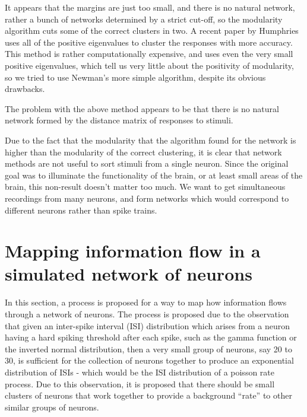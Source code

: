It appears that the margins are just too small, and there is no natural 
network, rather a bunch of networks determined by a strict cut-off, so the 
modularity algorithm cuts some of the correct clusters in two.  A recent paper 
by Humphries \cite{Humphries2011a} uses all of the positive eigenvalues to 
cluster the responses with more accuracy. This method is 
rather computationally expensive, and uses even the very small positive 
eigenvalues, which tell us very little about the positivity of modularity, so 
we tried to use Newman's more simple algorithm, despite its obvious drawbacks.

The problem with the above method appears to be that there is no natural network formed by the distance matrix of responses to stimuli.

Due to the fact that the modularity that the algorithm found for the network is 
higher than the modularity of the correct clustering, it is clear that network 
methods are not useful to sort stimuli from a single neuron.  Since the 
original goal was to illuminate the functionality of the brain, or at least 
small areas of the brain, this non-result doesn't matter too much.  We want to 
get simultaneous recordings from many neurons, and form networks which would 
correspond to different neurons rather than spike trains.
%

\section{Mapping information flow in a simulated network of neurons}

In this section, a process is proposed for a way to map how information flows through a network of neurons.  The process is proposed due to the observation that given an inter-spike interval (ISI) distribution which arises from a neuron having a hard spiking threshold after each spike, such as the gamma function or the inverted normal distribution, then a very small group of neurons, say 20 to 30, is sufficient for the collection of neurons together to produce an exponential distribution of ISIs - which would be the ISI distribution of a poisson rate process.  Due to this observation, it is proposed that there should be small clusters of neurons that work together to provide a background ``rate'' to other similar groups of neurons.

